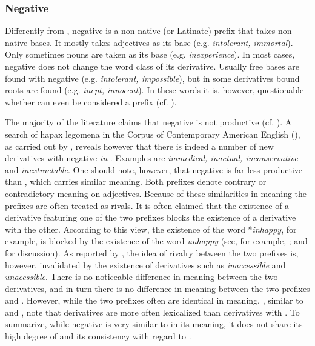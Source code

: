 \subsubsection{Negative } \label{negative in}

Differently from , negative  is a non-native (or Latinate) prefix that takes non-native bases. It mostly takes adjectives as its base (e.g. \textit{intolerant, immortal}). Only sometimes nouns are taken as its base (e.g. \textit{inexperience}).  In most cases, negative  does not change the word class of its derivative.  Usually free bases are found with negative  (e.g. \textit{intolerant, impossible}), but in some derivatives bound roots are found (e.g. \textit{inept, innocent}). In these words it is, however, questionable whether  can even be considered a prefix (cf. \citealt[356f., 611]{Bauer.2013}).

The majority of the literature claims that negative  is not productive (cf. \citealt[1688]{Bauer.2002}). A search of hapax legomena in the Corpus of Contemporary American English (\citealt{Davies.20082014}), as carried out by \citet[361]{Bauer.2013}, reveals however that there is indeed a number of new derivatives with negative \textit{in}-. Examples are \textit{immedical, inactual, inconservative} and \textit{inextractable}.  One should note, however, that negative  is far less productive than , which carries similar meaning. Both prefixes denote contrary or contradictory meaning on adjectives.
 Because of these similarities in meaning the prefixes are often treated as rivals. It is often claimed that the existence of a derivative featuring one of the two prefixes blocks the existence of  a derivative with the other. According to this view, the existence of the word *\textit{inhappy}, for example, is blocked by the existence of the word \textit{unhappy} (see, for example,  \citealt[467ff.]{Jespersen.1965}; \citealt[1688f.]{Bauer.2002} and \citealt[377ff.]{Bauer.2013} for discussion).  
As reported by \citet[377]{Bauer.2013}, the idea of rivalry between the two prefixes is, however, invalidated by the existence of derivatives such as \textit{inaccessible} and \textit{unacessible}. There is no noticeable difference in meaning between the two derivatives, and in turn there is no difference in meaning between the two prefixes  and .
However, while the two prefixes often are identical in meaning, \citet[379]{Bauer.2013}, similar to  \cite{Jespersen.1965} and \cite{Bauer.2002},  note that derivatives are more often lexicalized than derivatives with . To summarize, while negative  is very similar to  in its meaning, it does not share its high degree of  and its consistency with regard to .

